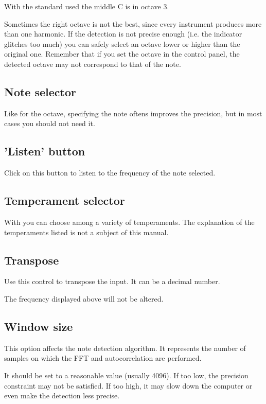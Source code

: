 With the standard used the middle C is in octave 3.

Sometimes the right octave is not the best, since every instrument
produces more than one harmonic. If the detection is not precise
enough (i.e. the indicator glitches too much) you can safely select
an octave lower or higher than the original one.
Remember that if you set the octave in the control panel, the detected
octave may not correspond to that of the note.

\subsection{Note selector}\label{note}

Like for the octave, specifying the note oftens improves the precision,
but in most cases you should not need it.

\subsection{'Listen' button}\label{listen}

Click on this button to listen to the frequency of the note selected.

\subsection{Temperament selector}\label{temperament}

With  you can choose among a variety of temperaments.
The explanation of the temperaments listed is not a subject of this
manual.

\subsection{Transpose}\label{transpose}

Use this control to transpose the input. It can be a decimal number.

The frequency displayed above will not be altered.

\subsection{Window size}\label{windowsize}

This option affects the note detection algorithm. It represents the number
of samples on which the FFT and autocorrelation are performed.

It should be set to a reasonable value (usually 4096).
If too low, the precision constraint may not be satisfied. If too high,
it may slow down the computer or even make the detection less precise.

